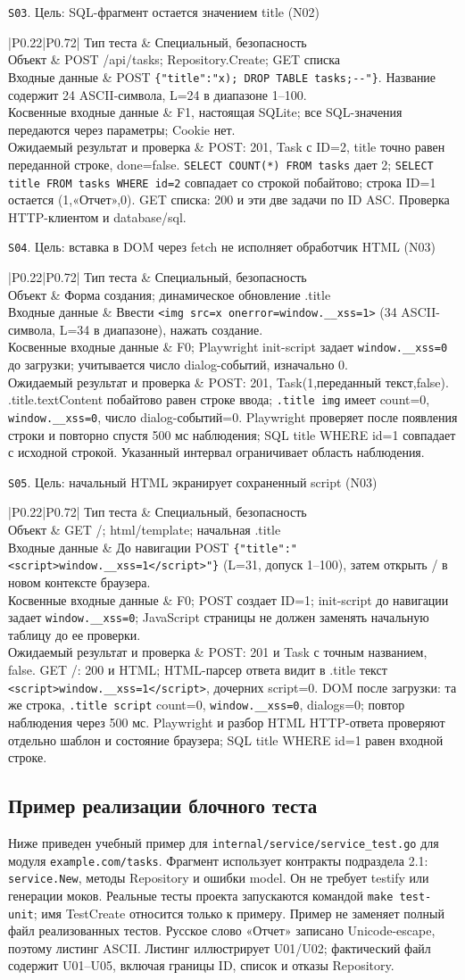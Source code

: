\documentclass[12pt,a4paper]{extarticle}
\newcommand{\code}[1]{\nolinkurl{#1}}
\newcommand{\rucode}[1]{\texttt{#1}}
\newcommand{\testcase}[6]{%
  \par\addvspace{12pt}\noindent #1\par\nopagebreak
  \begin{longtable}{|P{0.22\textwidth}|P{0.72\textwidth}|}
  \hline
  Тип теста & #2 \\ \hline
  Объект & #3 \\ \hline
  Входные данные & #4 \\ \hline
  Косвенные входные данные & #5 \\ \hline
  Ожидаемый результат и проверка & #6 \\ \hline
  \end{longtable}}
\begin{document}
\testcase{\texttt{S03}. Цель: SQL-фрагмент остается значением title (N02)}
{Специальный, безопасность}
{POST /api/tasks; Repository.Create; GET списка}
{POST \rucode{\{"title":"x\textquotesingle{}); DROP TABLE tasks;-{}-"\}}.
Название содержит 24 ASCII-символа, L=24 в диапазоне 1--100.}
{F1, настоящая SQLite; все SQL-значения передаются через параметры;
Cookie нет.}
{POST: 201, Task с ID=2, title точно равен переданной строке,
done=false. \code{SELECT COUNT(*) FROM tasks} дает 2;
\code{SELECT title FROM tasks WHERE id=2} совпадает со строкой побайтово;
строка ID=1 остается (1,«Отчет»,0). GET списка: 200 и эти две задачи
по ID ASC. Проверка HTTP-клиентом и database/sql.}

\testcase{\texttt{S04}. Цель: вставка в DOM через fetch не исполняет обработчик HTML (N03)}
{Специальный, безопасность}
{Форма создания; динамическое обновление .title}
{Ввести \code{<img src=x onerror=window.__xss=1>} (34 ASCII-символа,
L=34 в диапазоне), нажать создание.}
{F0; Playwright init-script задает \code{window.__xss=0} до загрузки;
учитывается число dialog-событий, изначально 0.}
{POST: 201, Task(1,переданный текст,false).
.title.textContent побайтово равен строке ввода;
\code{.title img} имеет count=0, \code{window.__xss=0},
число dialog-событий=0. Playwright проверяет после появления строки
и повторно спустя 500 мс наблюдения; SQL title WHERE id=1 совпадает
с исходной строкой. Указанный интервал ограничивает область наблюдения.}

\testcase{\texttt{S05}. Цель: начальный HTML экранирует сохраненный script (N03)}
{Специальный, безопасность}
{GET /; html/template; начальная .title}
{До навигации POST \rucode{\{"title":"<script>window.\_\_xss=1</script>"\}}
(L=31, допуск 1--100), затем открыть / в новом контексте браузера.}
{F0; POST создает ID=1; init-script до навигации задает \code{window.__xss=0};
JavaScript страницы не должен заменять начальную таблицу до ее проверки.}
{POST: 201 и Task с точным названием, false.
GET /: 200 и HTML; HTML-парсер ответа видит в .title текст
\code{<script>window.__xss=1</script>}, дочерних script=0.
DOM после загрузки: та же строка, \code{.title script} count=0,
\code{window.__xss=0}, dialogs=0; повтор наблюдения через 500 мс.
Playwright и разбор HTML HTTP-ответа проверяют отдельно шаблон
и состояние браузера; SQL title WHERE id=1 равен входной строке.}

\subsection{Пример реализации блочного теста}
Ниже приведен учебный пример для \code{internal/service/service_test.go}
для модуля \code{example.com/tasks}. Фрагмент использует контракты
подраздела 2.1: \code{service.New}, методы Repository и ошибки model.
Он не требует testify или генерации моков. Реальные тесты проекта запускаются
командой \code{make test-unit}; имя TestCreate относится только к примеру.
Пример не заменяет полный файл реализованных тестов.
Русское слово «Отчет» записано Unicode-escape, поэтому листинг ASCII.
Листинг иллюстрирует U01/U02; фактический файл содержит U01--U05,
включая границы ID, список и отказы Repository.
\end{document}
